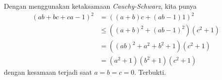 \begin{solusi}
    Dengan menggunakan ketaksamaan \textit{Cauchy-Schwarz}, kita punya
    \begin{align*}
        (ab+bc+ca-1)^2 &= ((a+b)c + (ab-1)1)^2\\
        &\le ((a+b)^2 + (ab-1)^2)(c^2+1) \\
        &= ((ab)^2+a^2+b^2+1)(c^2+1)\\
        &= (a^2+1)(b^2+1)(c^2+1)
    \end{align*}
    dengan kesamaan terjadi saat $a=b=c=0$. Terbukti.

\end{solusi}
